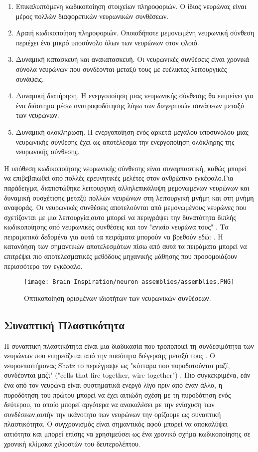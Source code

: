 \documentclass[12pt]{report}
\begin{document}
\begin{enumerate}
    \item Επικαλυπτόμενη κωδικοποίηση στοιχείων πληροφοριών. Ο ίδιος νευρώνας είναι μέρος πολλών διαφορετικών νευρωνικών συνθέσεων. 
    \item Αραιή κωδικοποίηση πληροφοριών. Οποιαδήποτε μεμονωμένη νευρωνική σύνθεση περιέχει ένα μικρό υποσύνολο όλων των νευρώνων στον φλοιό.  
    \item Δυναμική κατασκευή και ανακατασκευή. Οι νευρωνικές συνθέσεις είναι χρονικά σύνολα νευρώνων που συνδέονται μεταξύ τους με ευέλικτες λειτουργικές συνάψεις.
    \item Δυναμική διατήρηση. Η ενεργοποίηση μιας νευρωνικής σύνθεσης θα επιμείνει για ένα διάστημα μέσω ανατροφοδότησης λόγω των διεγερτικών συνάψεων μεταξύ των νευρώνων.
    \item Δυναμική ολοκλήρωση. Η ενεργοποίηση ενός αρκετά μεγάλου υποσυνόλου μιας νευρωνικής σύνθεσης έχει ως αποτέλεσμα την ενεργοποίηση ολόκληρης της νευρωνικής σύνθεσης.
\end{enumerate}
Η υπόθεση κωδικοποίησης νευρωνικής σύνθεσης είναι συναρπαστική, καθώς μπορεί να επιβεβαιωθεί από πολλές ερευνητικές μελέτες στον ανθρώπινο εγκέφαλο.Για παράδειγμα, διαπιστώθηκε λειτουργική αλληλεπικάλυψη μεμονωμένων νευρώνων και δυναμική συσχέτισης μεταξύ πολλών νευρώνων στη λειτουργική μνήμη και στη μνήμη αναφοράς.
Οι νευρωνικές συνθέσεις αποτελούνται από μεμονωμένους νευρώνες που σχετίζονται με μια λειτουργία,αυτο μπορεί να περιγράψει την δυνατότητα διπλής κωδικοποίησης από νευρωνικές συνθέσεις και τον "ενιαίο νευρώνα τους" . Τα πειραματικά δεδομένα για αυτά τα πειράματα μπορούν να βρεθούν εδώ: \cite{sakurai1999}. Η κατανόηση των σημαντικών αποτελεσμάτων πίσω από αυτά τα πειράματα μπορεί να επιτρέψει πιο αποτελεσματικές μεθόδους μηχανικής μάθησης που προσομοιάζουν περισσότερο τον εγκέφαλο.
\begin{figure}[htp]
    \texttt{[image: Brain Inspiration/neuron assemblies/assemblies.PNG]}
    \caption{Οπτικοποίηση ορισμένων ιδιοτήτων των νευρωνικών συνθέσεων.}
    \label{fig:assemblies}
\end{figure}


\subsection{Συναπτική Πλαστικότητα}
Η συναπτική πλαστικότητα είναι μια διαδικασία που τροποποιεί τη συνδεσιμότητα των νευρώνων που επηρεάζεται από την ποσότητα διέγερσης μεταξύ τους . Ο νευροεπιστήμονας \textlatin{Shatz} το περιέγραψε ως "κύτταρα που πυροδοτούνται μαζί, συνδέονται μαζί"  (\textlatin{"cells that fire together, wire together"}) \cite{shatz1992}. Πιο συγκεκριμένα, εάν ένα από τον νευρώνα είναι συστηματικά ενεργό λίγο πριν από έναν άλλο, η πυροδότηση του πρώτου μπορεί να έχει αιτιώδη σχέση με τη πυροδότηση ενός δεύτερου, το οποίο μπορεί αργότερα να ανακαλέσει με την ενίσχυση των συνδέσεων,αυτήν την ικάνοτητα των νευρώνων την ορίζουμε ως συναπτική πλαστικότητα. Ο συγχρονισμός είναι σημαντικός αφού μπορεί να αποκαλύψει αιτιότητα και μπορεί επίσης να χρησιμεύσει ως ένα χρονικό σχήμα κωδικοποίησης σε χρονική κλίμακα χιλιοστών του δευτερολέπτου.
\end{document}
